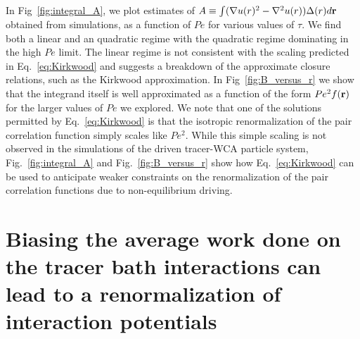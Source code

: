 \documentclass[pre,amsmath,preprintnumbers,10pt,article,notitlepage,twocolumn]{revtex4-1}
\begin{document}
In Fig~\ref{fig:integral_A}, we plot estimates of $A \equiv \int (\nabla u(r)^2 - \nabla^2 u(r))  \Delta(r) d{\bf r}$ obtained from simulations, as a function of $Pe$ for various values of $\tau$. 
We find both a linear and an quadratic regime with the quadratic regime dominating in the high $Pe$ limit. The linear regime is not consistent with the scaling predicted in Eq.~\ref{eq:Kirkwood} and suggests a breakdown of the approximate closure relations, such as the Kirkwood approximation. In Fig~\ref{fig:B_versus_r} we show that the integrand itself is well approximated as a function of the form $Pe^2 f({\bf r})$ for the larger values of $Pe$ we explored. We note that one of the solutions permitted by Eq.~\ref{eq:Kirkwood} is that the isotropic renormalization of the pair correlation function simply scales like $Pe^2$. While this simple scaling is not observed in the simulations of the driven tracer-WCA particle system, Fig.~\ref{fig:integral_A} and Fig.~\ref{fig:B_versus_r} show how Eq.~\ref{eq:Kirkwood} can be used to anticipate weaker constraints on the renormalization of the pair correlation functions due to non-equilibrium driving. 

\section{Biasing the average work done on the tracer bath interactions can lead to a renormalization of interaction potentials}
\end{document}
